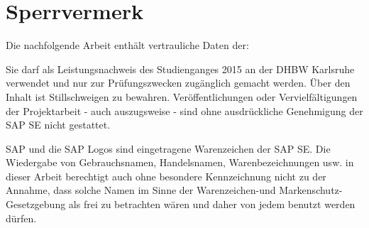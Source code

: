 \chapter*{Sperrvermerk}
Die nachfolgende Arbeit enthält vertrauliche Daten der:
\begin{quote}
	\firmaname

	\firmastrasse

	\firmaplz

\end{quote}

\vspace{0.5cm}

Sie darf als Leistungsnachweis des Studienganges \studiengang{} 2015 an der DHBW Karlsruhe verwendet und nur zur Prüfungszwecken zugänglich gemacht werden. Über den Inhalt ist Stillschweigen zu bewahren. Veröffentlichungen oder Vervielfältigungen der Projektarbeit - auch auszugsweise - sind ohne ausdrückliche Genehmigung der SAP SE nicht gestattet.

\vspace{0.5cm}

SAP und die SAP Logos sind eingetragene Warenzeichen der SAP SE. Die Wiedergabe von Gebrauchsnamen, Handelsnamen, Warenbezeichnungen usw. in dieser Arbeit berechtigt auch ohne besondere Kennzeichnung nicht zu der Annahme, dass solche Namen im Sinne der Warenzeichen-und Markenschutz-Gesetzgebung als frei zu betrachten wären und daher von jedem benutzt werden dürfen.